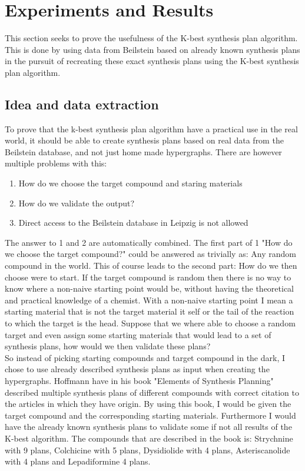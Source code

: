 \documentclass[a4paper,10pt,titlepage]{paper}
\begin{document}
\section{Experiments and Results}
\label{sec::Results}
This section seeks to prove the usefulness of the K-best synthesis plan algorithm. This is done by using data from Beilstein based on already known synthesis plans in the pursuit of recreating these exact synthesis plans using the K-best synthesis plan algorithm.
\subsection{Idea and data extraction}
To prove that the k-best synthesis plan algorithm have a practical use in the real world, it should be able to create synthesis plans based on real data from the Beilstein database, and not just home made hypergraphs. There are however multiple problems with this:
\begin{enumerate}
\item
How do we choose the target compound and staring materials
\item
How do we validate the output?
\item
Direct access to the Beilstein database in Leipzig is not allowed
\end{enumerate}
The answer to 1 and 2 are automatically combined. The first part of 1 "How do we choose the target compound?" could be  answered as trivially as: Any random compound in the world. This of course leads to the second part: How do we then choose were to start. If the target compound is random then there is no way to know where a non-naive starting point would be, without having the theoretical and practical knowledge of a chemist. With a non-naive starting point I mean a starting material that is not the target material it self or the tail of the reaction to which the target is the head. Suppose that we where able to choose a random target and even assign some starting materials that would lead to a set of synthesis plans, how would we then validate these plans?\\
So instead of picking starting compounds and target compound in the dark, I chose to use already described synthesis plans as input when creating the hypergraphs. Hoffmann\cite{SynthesisPlans} have in his book "Elements of Synthesis Planning" described multiple synthesis plans of different compounds with correct citation to the articles in which they have origin. By using this book, I would be given the target compound and the corresponding starting materials. Furthermore I would have the already known synthesis plans to validate some if not all results of the K-best algorithm. The compounds that are described in the book is: Strychnine with 9 plans, Colchicine with 5 plans, Dysidiolide with 4 plans, Asteriscanolide with 4 plans and Lepadiformine 4 plans.\\
\end{document}
